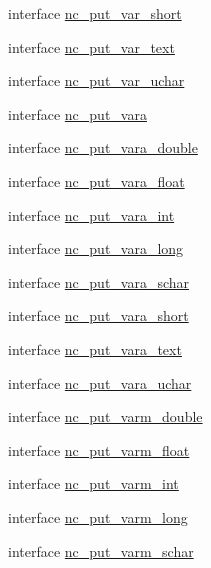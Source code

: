 \begin{DoxyCompactItemize}
\item 
interface \hyperlink{interfacenetcdf__nc__interfaces_1_1nc__put__var__short}{nc\+\_\+put\+\_\+var\+\_\+short}
\item 
interface \hyperlink{interfacenetcdf__nc__interfaces_1_1nc__put__var__text}{nc\+\_\+put\+\_\+var\+\_\+text}
\item 
interface \hyperlink{interfacenetcdf__nc__interfaces_1_1nc__put__var__uchar}{nc\+\_\+put\+\_\+var\+\_\+uchar}
\item 
interface \hyperlink{interfacenetcdf__nc__interfaces_1_1nc__put__vara}{nc\+\_\+put\+\_\+vara}
\item 
interface \hyperlink{interfacenetcdf__nc__interfaces_1_1nc__put__vara__double}{nc\+\_\+put\+\_\+vara\+\_\+double}
\item 
interface \hyperlink{interfacenetcdf__nc__interfaces_1_1nc__put__vara__float}{nc\+\_\+put\+\_\+vara\+\_\+float}
\item 
interface \hyperlink{interfacenetcdf__nc__interfaces_1_1nc__put__vara__int}{nc\+\_\+put\+\_\+vara\+\_\+int}
\item 
interface \hyperlink{interfacenetcdf__nc__interfaces_1_1nc__put__vara__long}{nc\+\_\+put\+\_\+vara\+\_\+long}
\item 
interface \hyperlink{interfacenetcdf__nc__interfaces_1_1nc__put__vara__schar}{nc\+\_\+put\+\_\+vara\+\_\+schar}
\item 
interface \hyperlink{interfacenetcdf__nc__interfaces_1_1nc__put__vara__short}{nc\+\_\+put\+\_\+vara\+\_\+short}
\item 
interface \hyperlink{interfacenetcdf__nc__interfaces_1_1nc__put__vara__text}{nc\+\_\+put\+\_\+vara\+\_\+text}
\item 
interface \hyperlink{interfacenetcdf__nc__interfaces_1_1nc__put__vara__uchar}{nc\+\_\+put\+\_\+vara\+\_\+uchar}
\item 
interface \hyperlink{interfacenetcdf__nc__interfaces_1_1nc__put__varm__double}{nc\+\_\+put\+\_\+varm\+\_\+double}
\item 
interface \hyperlink{interfacenetcdf__nc__interfaces_1_1nc__put__varm__float}{nc\+\_\+put\+\_\+varm\+\_\+float}
\item 
interface \hyperlink{interfacenetcdf__nc__interfaces_1_1nc__put__varm__int}{nc\+\_\+put\+\_\+varm\+\_\+int}
\item 
interface \hyperlink{interfacenetcdf__nc__interfaces_1_1nc__put__varm__long}{nc\+\_\+put\+\_\+varm\+\_\+long}
\item 
interface \hyperlink{interfacenetcdf__nc__interfaces_1_1nc__put__varm__schar}{nc\+\_\+put\+\_\+varm\+\_\+schar}

\end{DoxyCompactItemize}
